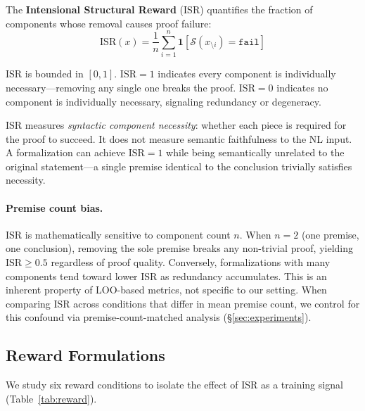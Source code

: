 The \textbf{Intensional Structural Reward} (ISR) quantifies the fraction of components whose removal causes proof failure:
\begin{equation}
  \text{ISR}(x) = \frac{1}{n} \sum_{i=1}^{n} \mathbf{1}\!\left[\mathcal{S}(x_{\setminus i}) = \texttt{fail}\right]
  \label{eq:isr}
\end{equation}

ISR is bounded in $[0, 1]$.
$\text{ISR} = 1$ indicates every component is individually necessary---removing any single one breaks the proof.
$\text{ISR} = 0$ indicates no component is individually necessary, signaling redundancy or degeneracy.

ISR measures \emph{syntactic component necessity}: whether each piece is required for the proof to succeed.
It does not measure semantic faithfulness to the NL input.
A formalization can achieve $\text{ISR} = 1$ while being semantically unrelated to the original statement---a single premise identical to the conclusion trivially satisfies necessity.

\paragraph{Premise count bias.}
ISR is mathematically sensitive to component count $n$.
When $n = 2$ (one premise, one conclusion), removing the sole premise breaks any non-trivial proof, yielding $\text{ISR} \geq 0.5$ regardless of proof quality.
Conversely, formalizations with many components tend toward lower ISR as redundancy accumulates.
This is an inherent property of LOO-based metrics, not specific to our setting.
When comparing ISR across conditions that differ in mean premise count, we control for this confound via premise-count-matched analysis (\S\ref{sec:experiments}).

\subsection{Reward Formulations}
\label{sec:reward}

We study six reward conditions to isolate the effect of ISR as a training signal (Table~\ref{tab:reward}).

